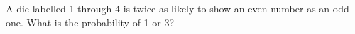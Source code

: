A die labelled 1 through 4 is twice as likely to show an even number as an odd one. What is the probability of 1 or 3?
